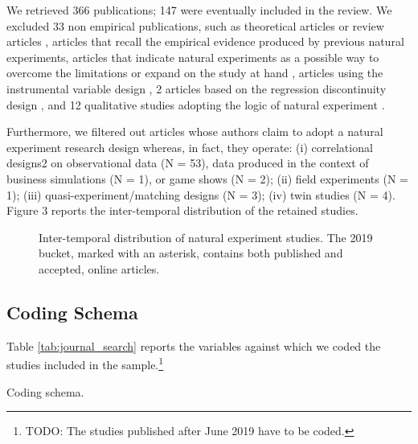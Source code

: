 \documentclass[nobib]{tufte-handout}
\newcommand{\todo}[1]{}
\renewcommand{\todo}[1]{{\color{red} TODO: {#1}}}
\begin{document}
\begin{refsection}
We retrieved 366 publications; 147 were eventually included in the review. 
We excluded 33 non empirical publications, such as theoretical
articles \parencite[e.g.,][]{makadok2011} or review articles \parencite[e.g.,][]{shaver2020},
articles that recall the empirical evidence produced by previous natural
experiments, articles that indicate natural experiments as a possible way to
overcome the limitations or expand on the study at hand \parencite[e.g.,][]{hsu2006},
articles using the instrumental variable design \parencite[e.g.,][]{zoloty2018}, 2 articles based on the regression discontinuity
design \parencite[e.g.,][]{flammer2015}, and 12 qualitative studies adopting the logic of
natural experiment \parencite[e.g.,][]{powell2017}.

Furthermore, we filtered out articles whose authors claim to adopt a natural
experiment research design whereas, in fact, they operate: (i) correlational
designs2 on observational data (N = 53), data produced in the context of
business simulations (N = 1), or game shows (N = 2); (ii) field experiments (N =
1); (iii) quasi-experiment/matching designs (N = 3); (iv) twin studies (N = 4).
Figure 3 reports the inter-temporal distribution of the retained studies.

\begin{figure}[]
    \centering
    
    \caption{Inter-temporal distribution of natural experiment studies.
    The 2019 bucket, marked with an asterisk, contains both published and 
    accepted, online articles.}
    \label{fig:studies_over_time}
\end{figure}

\subsection{Coding Schema}
\label{sub:coding_schema}

Table \ref{tab:journal_search} reports the variables against which we coded 
the studies included in the sample.\footnote{\todo{The studies published after June 2019 
have to be coded.}}

\begin{table}
    \large
    \sffamily
    \begin{small}
        \caption{}
        \label{tab:coding_schema}
        \begin{center}
            
        \end{center}
    \end{small}
    \caption{Coding schema.}
\end{table}



\end{refsection}
\end{document}
